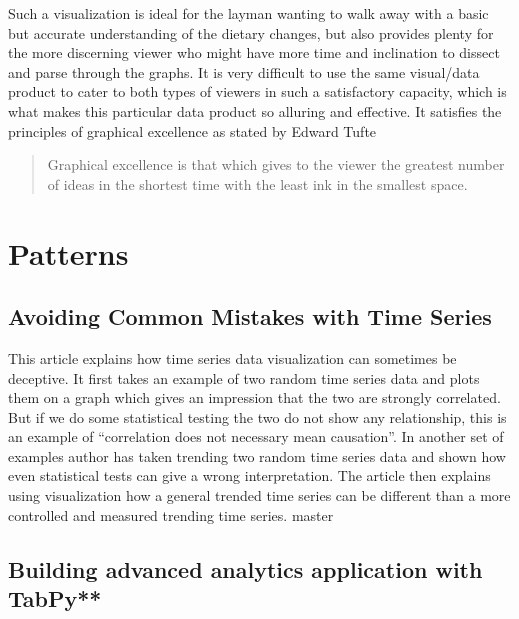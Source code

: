 \documentclass[]{book}
\theoremstyle{definition}
\theoremstyle{definition}
\theoremstyle{definition}
\theoremstyle{remark}
\begin{document}
Such a visualization is ideal for the layman wanting to walk away with a
basic but accurate understanding of the dietary changes, but also
provides plenty for the more discerning viewer who might have more time
and inclination to dissect and parse through the graphs. It is very
difficult to use the same visual/data product to cater to both types of
viewers in such a satisfactory capacity, which is what makes this
particular data product so alluring and effective. It satisfies the
principles of graphical excellence as stated by Edward Tufte
\citep{visual_display}

\begin{quote}
Graphical excellence is that which gives to the viewer the greatest
number of ideas in the shortest time with the least ink in the smallest
space.
\end{quote}

\chapter{Patterns}\label{patterns}

\section{Avoiding Common Mistakes with Time
Series}\label{avoiding-common-mistakes-with-time-series}

This article explains how time series data visualization can sometimes
be deceptive. It first takes an example of two random time series data
and plots them on a graph which gives an impression that the two are
strongly correlated. But if we do some statistical testing the two do
not show any relationship, this is an example of ``correlation does not
necessary mean causation''. In another set of examples author has taken
trending two random time series data and shown how even statistical
tests can give a wrong interpretation. The article then explains using
visualization how a general trended time series can be different than a
more controlled and measured trending time series. master

\section{Building advanced analytics application with
TabPy**}\label{building-advanced-analytics-application-with-tabpy}

\citep{TabPy}
\end{document}
